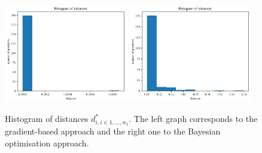 \begin{figure}[h]
    \begin{center}
      \includegraphics[width=0.48\textwidth]{./Thesis/images/chapter4/ma2_distance_hist.png}
      \includegraphics[width=0.48\textwidth]{./Thesis/images/chapter4/ma2_distance_hist_bo.png}
    \end{center}
  \caption{Histogram of distances $d_{i, i \in {1, \ldots, n_1}}^*$. The left graph corresponds to the gradient-based approach and the right one to the Bayesian optimisation approach.}
  \label{fig:ma2_2}
\end{figure}

